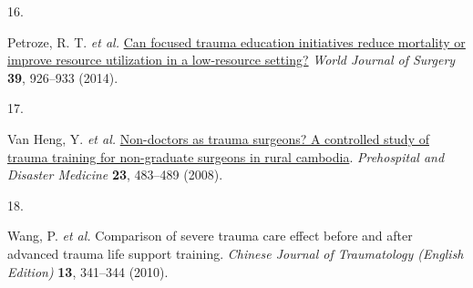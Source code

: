 \documentclass[
]{article}
\newlength{\cslhangindent}
\newlength{\csllabelwidth}
\newlength{\cslentryspacingunit} %
\newenvironment{CSLReferences}[2] %
 {%
  \setlength{\parindent}{0pt}
  \ifodd #1
  \let\oldpar\par
  \def\par{\hangindent=\cslhangindent\oldpar}
  \fi
  \setlength{\parskip}{#2\cslentryspacingunit}
 }%
 {}
\newcommand{\CSLLeftMargin}[1]{\parbox[t]{\csllabelwidth}{#1}}
\newcommand{\CSLRightInline}[1]{\parbox[t]{\linewidth - \csllabelwidth}{#1}\break}
\begin{document}
\begin{CSLReferences}{0}{0}
\leavevmode{}%
\CSLLeftMargin{16. }
\CSLRightInline{Petroze, R. T. \emph{et al.} \href{https://doi.org/10.1007/s00268-014-2899-y}{Can focused trauma education initiatives reduce mortality or improve resource utilization in a low-resource setting?} \emph{World Journal of Surgery} \textbf{39}, 926--933 (2014).}

\leavevmode{}%
\CSLLeftMargin{17. }
\CSLRightInline{Van Heng, Y. \emph{et al.} \href{https://doi.org/10.1017/s1049023x00006282}{Non-doctors as trauma surgeons? A controlled study of trauma training for non-graduate surgeons in rural cambodia}. \emph{Prehospital and Disaster Medicine} \textbf{23}, 483--489 (2008).}

\leavevmode{}%
\CSLLeftMargin{18. }
\CSLRightInline{Wang, P. \emph{et al.} Comparison of severe trauma care effect before and after advanced trauma life support training. \emph{Chinese Journal of Traumatology (English Edition)} \textbf{13}, 341--344 (2010).}

\end{CSLReferences}
\end{document}
